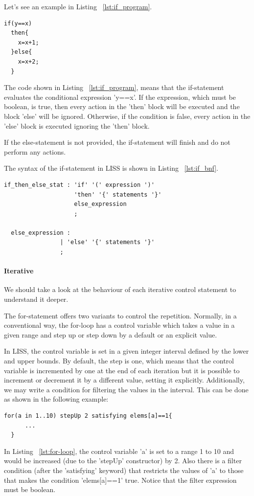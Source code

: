 \documentclass[
  oneside,
  11pt, a4paper,
  footinclude=true,
  headinclude=true,
  cleardoublepage=empty
]{scrbook}
\begin{document}
Let's see an example in Listing ~\ref{lst:if_program}.

\begin{lstlisting}[caption={LISS syntax of a if statement},label={lst:if_program}]
  if(y==x)
  then{
    x=x+1;
  }else{
    x=x+2;
  }
\end{lstlisting}

The code shown in Listing ~\ref{lst:if_program}, means that the if-statement evaluates the conditional expression 'y==x'.
If the expression, which must be boolean, is true, then every action in the 'then' block will be executed and the block 'else' will be ignored.
Otherwise, if the condition is false, every action in the 'else' block is executed ignoring the 'then' block.

If the else-statement is not provided, the if-statement will finish and do not perform any actions.


The syntax of the if-statement in LISS is shown in Listing ~\ref{lst:if_bnf}.



\begin{lstlisting}[caption={CFG for iterative statement in LISS},label={lst:if_bnf}]
  if_then_else_stat : 'if' '(' expression ')'
                    'then' '{' statements '}'
                    else_expression
                    ;

  else_expression :
                | 'else' '{' statements '}'
                ;
\end{lstlisting}

\paragraph{Iterative}

We should take a look at the behaviour of each iterative control statement to understand it deeper.

The  for-statement offers two variants to control the repetition.
Normally, in a conventional way, the for-loop has a control variable which takes a value in a given range and step up or step down by a default or an explicit value.

In LISS, the control variable is set in a given integer interval defined by the lower and upper bounds. By default, the step is one, which means that the control variable is incremented by one at the end of each iteration but it is possible to increment or decrement it by a different value, setting it explicitly.
Additionally, we may write a condition for filtering the values in the interval.
This can be done as shown in the following example:
\begin{lstlisting}[caption={LISS syntax of a for-loop statement},label={lst:for-loop}]
  for(a in 1..10) stepUp 2 satisfying elems[a]==1{
	  ...
  }
\end{lstlisting}
In Listing ~\ref{lst:for-loop}, the control variable 'a' is set to a range 1 to 10 and would be increased (due to the 'stepUp' constructor) by 2. Also there is a filter condition (after the 'satisfying' keyword) that restricts the values of 'a' to those that makes the condition 'elems[a]==1' true. Notice that the filter expression must be boolean. 
\end{document}
